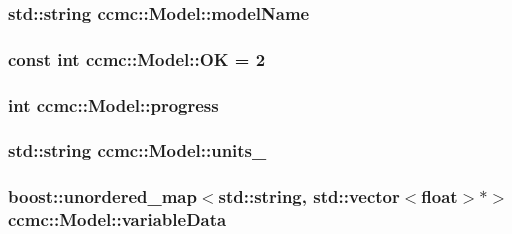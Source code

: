 \hypertarget{classccmc_1_1_model_a6165e9aac67ae0cbe536e350d03161f3}{
\subsubsection[{model\-Name}]{\setlength{\rightskip}{0pt plus 5cm}std\-::string ccmc\-::\-Model\-::model\-Name\hspace{0.3cm}{\ttfamily [protected]}}}\label{classccmc_1_1_model_a6165e9aac67ae0cbe536e350d03161f3}
\hypertarget{classccmc_1_1_model_a0a921cfb116d7b5e8e7b49b42c151f18}{
\subsubsection[{O\-K}]{\setlength{\rightskip}{0pt plus 5cm}const int ccmc\-::\-Model\-::\-O\-K = 2\hspace{0.3cm}{\ttfamily [static]}}}\label{classccmc_1_1_model_a0a921cfb116d7b5e8e7b49b42c151f18}
\hypertarget{classccmc_1_1_model_a300d5ede0268098899a9fb248281ead5}{
\subsubsection[{progress}]{\setlength{\rightskip}{0pt plus 5cm}int ccmc\-::\-Model\-::progress\hspace{0.3cm}{\ttfamily [protected]}}}\label{classccmc_1_1_model_a300d5ede0268098899a9fb248281ead5}
\hypertarget{classccmc_1_1_model_ac6ae99aaeac03d14ffde2e82c39b436a}{
\subsubsection[{units\-\_\-}]{\setlength{\rightskip}{0pt plus 5cm}std\-::string ccmc\-::\-Model\-::units\-\_\-\hspace{0.3cm}{\ttfamily [protected]}}}\label{classccmc_1_1_model_ac6ae99aaeac03d14ffde2e82c39b436a}
\hypertarget{classccmc_1_1_model_a69edb30c3bc8ce3c68ec0a883c219d94}{
\subsubsection[{variable\-Data}]{\setlength{\rightskip}{0pt plus 5cm}boost\-::unordered\-\_\-map$<$std\-::string, std\-::vector$<$float$>$$\ast$$>$ ccmc\-::\-Model\-::variable\-Data\hspace{0.3cm}{\ttfamily [protected]}}}\label{classccmc_1_1_model_a69edb30c3bc8ce3c68ec0a883c219d94}
